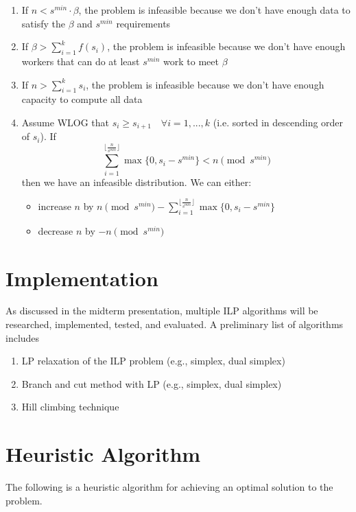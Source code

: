 \documentclass[
    draft,
    final,
]{article}
\begin{document}
    \begin{enumerate}
        \item If $n < s^{min} \cdot \beta$, the problem is infeasible because we don't have enough data to satisfy the $\beta$ and $s^{min}$ requirements
        \item If $\beta > \sum_{i=1}^k f(s_i)$, the problem is infeasible because we don't have enough workers that can do at least $s^{min}$ work to meet $\beta$
        \item If $n > \sum_{i=1}^k s_i$, the problem is infeasible because we don't have enough capacity to compute all data
        \item Assume WLOG that $s_i \geq s_{i+1} \quad \forall i = 1, ..., k$ (i.e. sorted in descending order of $s_i$). If
            \[ \sum_{i=1}^{ \lfloor \frac{n}{s^{min}} \rfloor }  \max\{0, s_i - s^{min}\} < n \pmod{s^{min}} \]
            then we have an infeasible distribution. We can either:
            \begin{itemize}
                \item increase $n$ by $n \pmod{s^{min}} - \sum_{i=1}^{\lfloor \frac{n}{s^{min}} \rfloor} \max\{0, s_i - s^{min}\}$
                \item decrease $n$ by $-n \pmod{s^{min}}$
            \end{itemize}
    \end{enumerate}
    
    \section{Implementation}
    
    As discussed in the midterm presentation, multiple ILP algorithms will be researched, implemented, tested, and evaluated. A preliminary list of algorithms includes
    
    \begin{enumerate}
        \item LP relaxation of the ILP problem (e.g., simplex, dual simplex)
        \item Branch and cut method with LP (e.g., simplex, dual simplex)
        \item Hill climbing technique
    \end{enumerate}
    
    \section{Heuristic Algorithm}
    The following is a heuristic algorithm for achieving an optimal solution to the problem.
    
\end{document}
